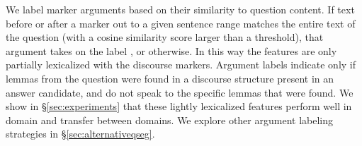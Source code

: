 \vspace{-1mm}
{} 
We label marker arguments based on their similarity to question content.
If text before or after a marker out to a given sentence range matches the entire text of the question (with a cosine similarity score larger than a threshold), that argument takes on the label , or  otherwise.  
In this way the features are only partially lexicalized with the discourse markers. Argument labels indicate only if lemmas from the question were found in a discourse structure present in an answer candidate, and do not speak to the specific lemmas that were found. We show in \S\ref{sec:experiments} that these lightly lexicalized features perform well in domain and transfer between domains. We explore other argument labeling strategies in \S\ref{sec:alternativeqseg}.


